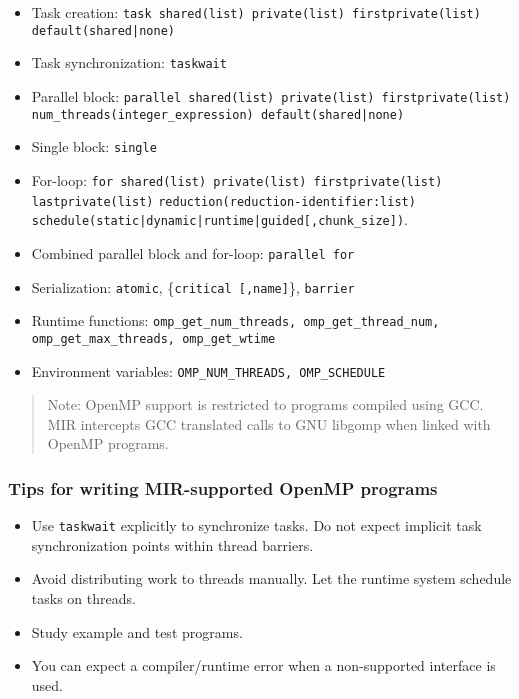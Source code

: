 \documentclass[11pt,a4paper]{article}
\begin{document}
\begin{itemize}
    \item Task creation: \texttt{task shared(list) private(list) firstprivate(list) default(shared|none)}
    \item Task synchronization: \texttt{taskwait}
    \item Parallel block: \texttt{parallel shared(list) private(list) firstprivate(list) num\_threads(integer\_expression) default(shared|none)}
    \item Single block: \texttt{single}
    \item For-loop: \texttt{for shared(list) private(list) firstprivate(list) lastprivate(list)} \texttt{reduction(reduction-identifier:list)} \\ \texttt{schedule(static|dynamic|runtime|guided[,chunk\_size])}.
    \item Combined parallel block and for-loop: \texttt{parallel for}
    \item Serialization: \texttt{atomic}, \{\texttt{critical [,name]}\}, \texttt{barrier}
    \item Runtime functions: \texttt{omp\_get\_num\_threads, omp\_get\_thread\_num, \\omp\_get\_max\_threads, omp\_get\_wtime}
    \item Environment variables: \texttt{OMP\_NUM\_THREADS, OMP\_SCHEDULE}
\end{itemize}

\begin{framed}
\begin{quote}
Note: OpenMP support is restricted to programs compiled using GCC. MIR intercepts GCC translated calls to GNU libgomp when linked with OpenMP programs.
\end{quote}
\end{framed}

\subsubsection{Tips for writing MIR-supported OpenMP programs}\label{tips-for-writing-mir-supported-openmp-programs}

\begin{itemize}
    \item Use \texttt{taskwait} explicitly to synchronize tasks. Do not expect implicit task synchronization points within thread barriers.
        \item Avoid distributing work to threads manually. Let the runtime system schedule tasks on threads.
        \item Study example and test programs.
        \item You can expect a compiler/runtime error when a non-supported interface is used.
\end{itemize}
\end{document}
